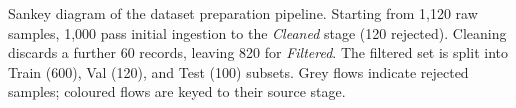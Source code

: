 \caption{Sankey diagram of the dataset preparation pipeline. Starting from 1{,}120 raw samples, 1{,}000 pass initial ingestion to the \emph{Cleaned} stage (120 rejected). Cleaning discards a further 60 records, leaving 820 for \emph{Filtered}. The filtered set is split into Train (600), Val (120), and Test (100) subsets. Grey flows indicate rejected samples; coloured flows are keyed to their source stage.}
